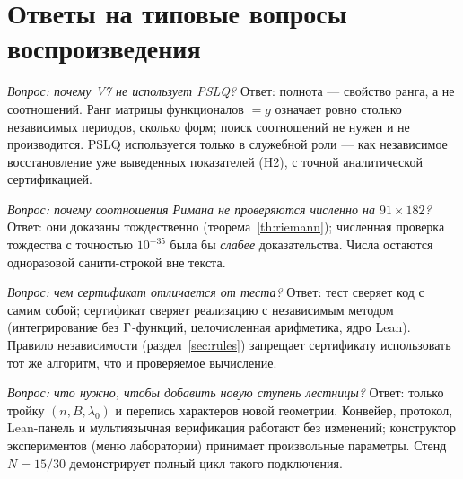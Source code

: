 \section{Ответы на типовые вопросы воспроизведения}\label{sec:faq}

\emph{Вопрос: почему V7 не использует PSLQ?}
Ответ: полнота --- свойство ранга, а не соотношений. Ранг матрицы
функционалов $=g$ означает ровно столько независимых периодов,
сколько форм; поиск соотношений не нужен и не производится. PSLQ
используется только в служебной роли --- как независимое
восстановление уже выведенных показателей (H2), с точной
аналитической сертификацией.

\emph{Вопрос: почему соотношения Римана не проверяются численно на
$91\times182$?}
Ответ: они доказаны тождественно (теорема~\ref{th:riemann});
численная проверка тождества с точностью $10^{-35}$ была бы
\emph{слабее} доказательства. Числа остаются одноразовой
санити-строкой вне текста.

\emph{Вопрос: чем сертификат отличается от теста?}
Ответ: тест сверяет код с самим собой; сертификат сверяет
реализацию с независимым методом (интегрирование без
$\Gamma$-функций, целочисленная арифметика, ядро Lean). Правило
независимости (раздел~\ref{sec:rules}) запрещает сертификату
использовать тот же алгоритм, что и проверяемое вычисление.

\emph{Вопрос: что нужно, чтобы добавить новую ступень лестницы?}
Ответ: только тройку $(n,B,\lambda_0)$ и перепись характеров
новой геометрии. Конвейер, протокол, Lean-панель и мультиязычная
верификация работают без изменений; конструктор экспериментов
(меню лаборатории) принимает произвольные параметры. Стенд
$N=15/30$ демонстрирует полный цикл такого подключения.
